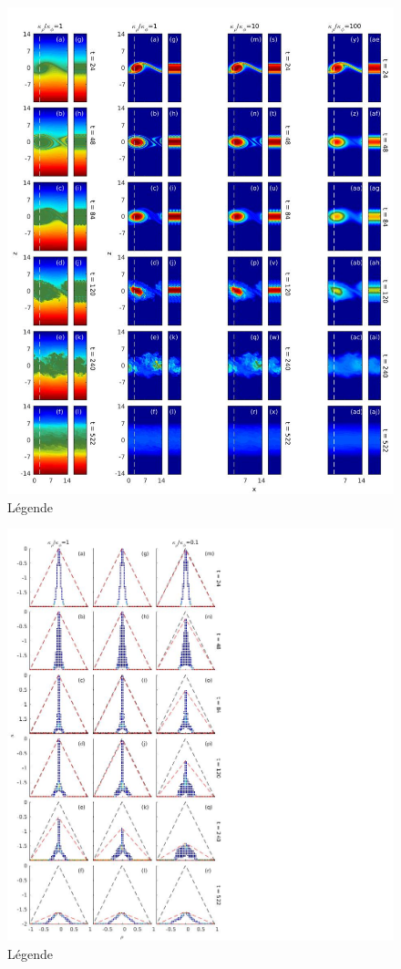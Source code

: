 \documentclass[a4paper,12pt]{article}
\begin{document}
    \begin{figure}[!h]
        \centering
        \label{phidiff}
        \includegraphics[width=0.95\linewidth]{figures/phidiff.png}
        \caption{Légende}
    \end{figure}
    
    \begin{figure}[!h]
        \centering
        \label{scatterplot_phi}
        \includegraphics[width=1.3\linewidth]{figures/scatterplot_phidiff.jpg}
        \caption{Légende}
    \end{figure}
    
\end{document}
